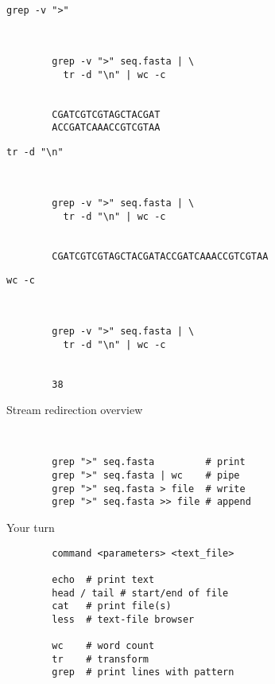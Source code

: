 \documentclass[xcolor=dvipsnames]{beamer}
\begin{document}
\begin{frame}[fragile]
	\huge
	\verb!grep -v ">"!
	\Large
	\begin{verbatim}


		grep -v ">" seq.fasta | \
		  tr -d "\n" | wc -c


		CGATCGTCGTAGCTACGAT
		ACCGATCAAACCGTCGTAA
	\end{verbatim}
\end{frame}

\begin{frame}[fragile]
	\huge
	\verb!tr -d "\n"!
	\Large
	\begin{verbatim}


		grep -v ">" seq.fasta | \
		  tr -d "\n" | wc -c


		CGATCGTCGTAGCTACGATACCGATCAAACCGTCGTAA
	\end{verbatim}
\end{frame}

\begin{frame}[fragile]
	\huge
	\verb!wc -c!
	\Large
	\begin{verbatim}


		grep -v ">" seq.fasta | \
		  tr -d "\n" | wc -c


		38
	\end{verbatim}
\end{frame}

\begin{frame}[fragile]
	\huge
	Stream redirection overview
	\Large
	\begin{verbatim}


		grep ">" seq.fasta         # print
		grep ">" seq.fasta | wc    # pipe
		grep ">" seq.fasta > file  # write
		grep ">" seq.fasta >> file # append
	\end{verbatim}
\end{frame}

\begin{frame}[fragile]
	\huge
	Your turn
	\Large
	\begin{verbatim}
		command <parameters> <text_file>

		echo  # print text
		head / tail # start/end of file
		cat   # print file(s)
		less  # text-file browser

		wc    # word count
		tr    # transform
		grep  # print lines with pattern
	\end{verbatim}
\end{frame}
\end{document}
